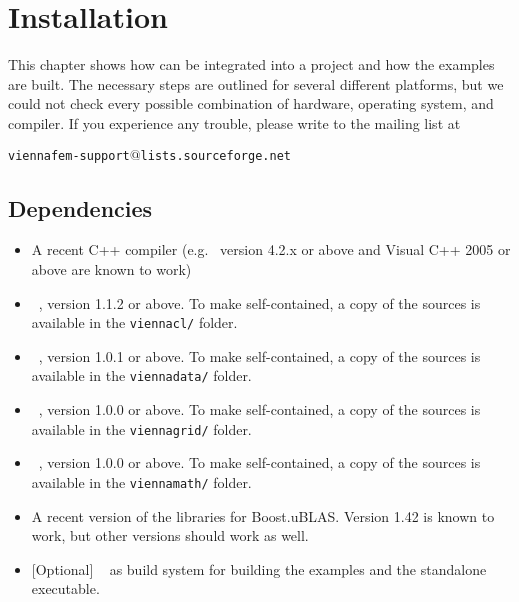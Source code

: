 \chapter{Installation}

This chapter shows how {\ViennaFEM} can be integrated into a project and how
the examples are built. The necessary steps are outlined for several different
platforms, but we could not check every possible combination of hardware,
operating system, and compiler. If you experience any trouble, please write to
the mailing list at \\
\begin{center}
\texttt{viennafem-support$@$lists.sourceforge.net} 
\end{center}


\section{Dependencies}
\label{dependencies}

\begin{itemize}
 \item A recent C++ compiler (e.g.~{\GCC} version 4.2.x or above and Visual C++
2005 or above are known to work)
 \item {\ViennaCL}~\cite{ViennaCL}, version 1.1.2 or above. To make {\ViennaFEM} self-contained, a copy of the {\ViennaCL} sources is available in the \lstinline|viennacl/| folder.
 \item {\ViennaData}~\cite{ViennaData}, version 1.0.1 or above. To make {\ViennaFEM} self-contained, a copy of the {\ViennaData} sources is available in the \lstinline|viennadata/| folder.
 \item {\ViennaGrid}~\cite{ViennaGrid}, version 1.0.0 or above. To make {\ViennaFEM} self-contained, a copy of the {\ViennaGrid} sources is available in the \lstinline|viennagrid/| folder.
 \item {\ViennaMath}~\cite{ViennaMath}, version 1.0.0 or above. To make {\ViennaFEM} self-contained, a copy of the {\ViennaMath} sources is available in the \lstinline|viennamath/| folder.
 \item A recent version of the {\Boost} libraries \cite{boost} for Boost.uBLAS. Version 1.42 is known to work, but other versions should work as well.
 \item {[}Optional{]} {\CMake}~\cite{cmake} as build system for building the examples and the standalone executable.
\end{itemize}


